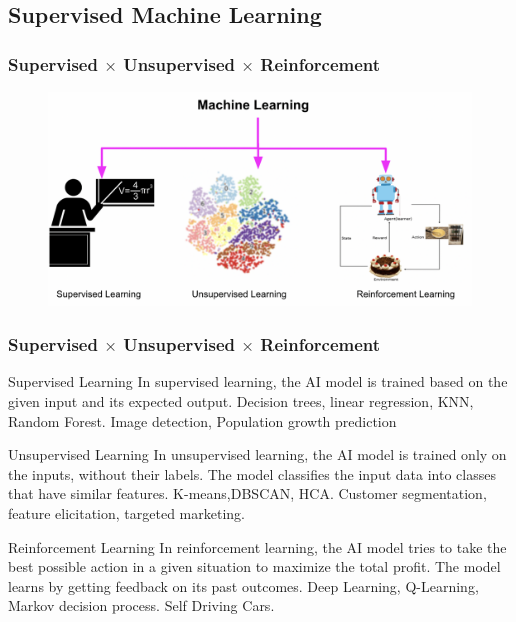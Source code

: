 \documentclass{beamer}
\begin{document}
\subsection{Supervised Machine Learning}
\begin{frame}
\frametitle{Supervised $\times$ Unsupervised $\times$ Reinforcement}
\begin{figure}[h]
 \centering
 \includegraphics[scale=0.25]{super_intro.png}
\end{figure}
\end{frame}
\begin{frame}
\frametitle{Supervised $\times$ Unsupervised $\times$ Reinforcement}
\begin{block}{Supervised Learning}
In supervised learning, the AI model is trained based on the given input and its expected output. Decision trees, linear regression, KNN, Random Forest. Image detection, Population growth prediction
\end{block}
\begin{block}{Unsupervised Learning}
In unsupervised learning, the AI model is trained only on the inputs, without their labels. The model classifies the input data into classes that have similar features. K-means,DBSCAN, HCA. Customer segmentation, feature elicitation, targeted marketing.
\end{block}
\begin{block}{Reinforcement Learning}
In reinforcement learning, the AI model tries to take the best possible action in a given situation to maximize the total profit. The model learns by getting feedback on its past outcomes. Deep Learning, Q-Learning, Markov decision process. Self Driving Cars.
\end{block}
\end{frame}
\end{document}
